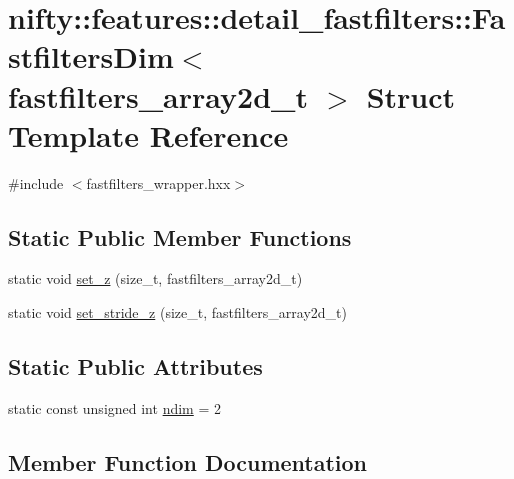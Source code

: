 \hypertarget{structnifty_1_1features_1_1detail__fastfilters_1_1FastfiltersDim_3_01fastfilters__array2d__t_01_4}{}\section{nifty\+:\+:features\+:\+:detail\+\_\+fastfilters\+:\+:Fastfilters\+Dim$<$ fastfilters\+\_\+array2d\+\_\+t $>$ Struct Template Reference}
\label{structnifty_1_1features_1_1detail__fastfilters_1_1FastfiltersDim_3_01fastfilters__array2d__t_01_4}


{\ttfamily \#include $<$fastfilters\+\_\+wrapper.\+hxx$>$}

\subsection*{Static Public Member Functions}
\begin{DoxyCompactItemize}
\item 
static void \hyperlink{structnifty_1_1features_1_1detail__fastfilters_1_1FastfiltersDim_3_01fastfilters__array2d__t_01_4_a0e101cf599880535412ae133a320baaa}{set\+\_\+z} (size\+\_\+t, fastfilters\+\_\+array2d\+\_\+t)
\item 
static void \hyperlink{structnifty_1_1features_1_1detail__fastfilters_1_1FastfiltersDim_3_01fastfilters__array2d__t_01_4_af8d87ecb51f9395aea610bfbdd438c58}{set\+\_\+stride\+\_\+z} (size\+\_\+t, fastfilters\+\_\+array2d\+\_\+t)
\end{DoxyCompactItemize}
\subsection*{Static Public Attributes}
\begin{DoxyCompactItemize}
\item 
static const unsigned int \hyperlink{structnifty_1_1features_1_1detail__fastfilters_1_1FastfiltersDim_3_01fastfilters__array2d__t_01_4_ab0716a0f677fcbc75feb94ff1b05604e}{ndim} = 2
\end{DoxyCompactItemize}


\subsection{Member Function Documentation}
\hypertarget{structnifty_1_1features_1_1detail__fastfilters_1_1FastfiltersDim_3_01fastfilters__array2d__t_01_4_af8d87ecb51f9395aea610bfbdd438c58}{}
